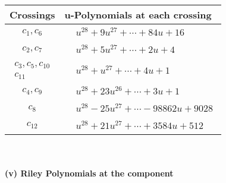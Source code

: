 \documentclass[1p]{elsarticle_modified}
\theoremstyle{definition}
\begin{document}
\begin{tabular}{m{50pt}|m{274pt}}
Crossings & \hspace{64pt}u-Polynomials at each crossing \\
\hline $$\begin{aligned}c_{1},c_{6}\end{aligned}$$&$\begin{aligned}
&u^{28}+9 u^{27}+\cdots+84 u+16
\end{aligned}$\\
\hline $$\begin{aligned}c_{2},c_{7}\end{aligned}$$&$\begin{aligned}
&u^{28}+5 u^{27}+\cdots+2 u+4
\end{aligned}$\\
\hline $$\begin{aligned}c_{3},c_{5},c_{10}\\c_{11}\end{aligned}$$&$\begin{aligned}
&u^{28}+u^{27}+\cdots+4 u+1
\end{aligned}$\\
\hline $$\begin{aligned}c_{4},c_{9}\end{aligned}$$&$\begin{aligned}
&u^{28}+23 u^{26}+\cdots+3 u+1
\end{aligned}$\\
\hline $$\begin{aligned}c_{8}\end{aligned}$$&$\begin{aligned}
&u^{28}-25 u^{27}+\cdots-98862 u+9028
\end{aligned}$\\
\hline $$\begin{aligned}c_{12}\end{aligned}$$&$\begin{aligned}
&u^{28}+21 u^{27}+\cdots+3584 u+512
\end{aligned}$\\
\hline
\end{tabular}\\~\\
\newpage\renewcommand{\arraystretch}{1}
\flushleft \textbf{(v) Riley Polynomials at the component}\newline \\
\end{document}
